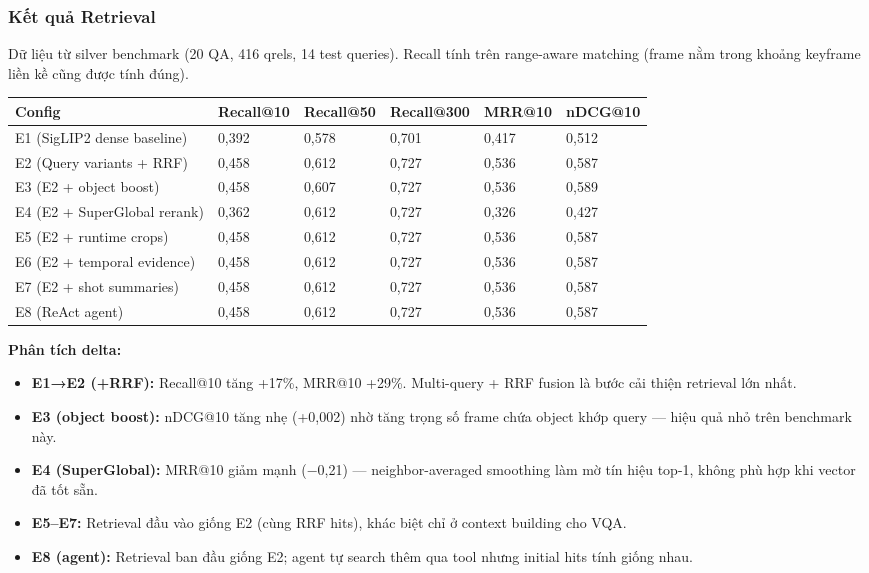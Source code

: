 \documentclass[12pt,a4paper,onecolumn]{article}
\begin{document}
\subsubsection{Kết quả Retrieval}

Dữ liệu từ silver benchmark (20 QA, 416 qrels, 14 test queries). Recall tính trên range-aware matching (frame nằm trong khoảng keyframe liền kề cũng được tính đúng).

\begin{center}
\small
\begin{tabular}{l l l l l l}
\toprule
Config & Recall@10 & Recall@50 & Recall@300 & MRR@10 & nDCG@10 \\
\midrule
E1 (SigLIP2 dense baseline) & 0,392 & 0,578 & 0,701 & 0,417 & 0,512 \\
E2 (Query variants + RRF) & 0,458 & 0,612 & 0,727 & 0,536 & 0,587 \\
E3 (E2 + object boost) & 0,458 & 0,607 & 0,727 & 0,536 & 0,589 \\
E4 (E2 + SuperGlobal rerank) & 0,362 & 0,612 & 0,727 & 0,326 & 0,427 \\
E5 (E2 + runtime crops) & 0,458 & 0,612 & 0,727 & 0,536 & 0,587 \\
E6 (E2 + temporal evidence) & 0,458 & 0,612 & 0,727 & 0,536 & 0,587 \\
E7 (E2 + shot summaries) & 0,458 & 0,612 & 0,727 & 0,536 & 0,587 \\
E8 (ReAct agent) & 0,458 & 0,612 & 0,727 & 0,536 & 0,587 \\
\bottomrule
\end{tabular}
\end{center}


\textbf{Phân tích delta:}

\begin{itemize}
  \item \textbf{E1→E2 (+RRF):} Recall@10 tăng +17\%, MRR@10 +29\%. Multi-query + RRF fusion là bước cải thiện retrieval lớn nhất.
  \item \textbf{E3 (object boost):} nDCG@10 tăng nhẹ (+0,002) nhờ tăng trọng số frame chứa object khớp query — hiệu quả nhỏ trên benchmark này.
  \item \textbf{E4 (SuperGlobal):} MRR@10 giảm mạnh (−0,21) — neighbor-averaged smoothing làm mờ tín hiệu top-1, không phù hợp khi vector đã tốt sẵn.
  \item \textbf{E5–E7:} Retrieval đầu vào giống E2 (cùng RRF hits), khác biệt chỉ ở context building cho VQA.
  \item \textbf{E8 (agent):} Retrieval ban đầu giống E2; agent tự search thêm qua tool nhưng initial hits tính giống nhau.
\end{itemize}
\end{document}
